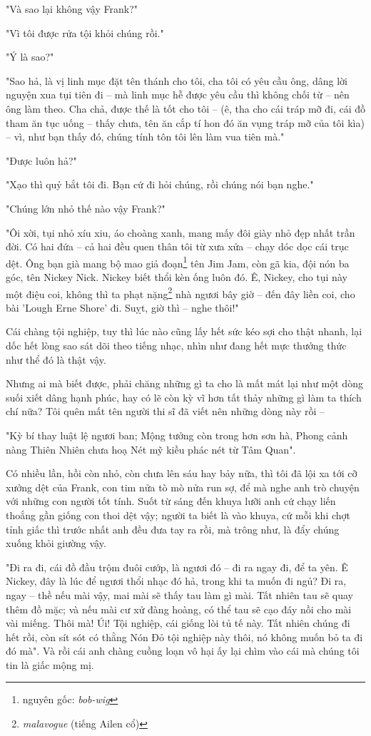 "Và sao lại không vậy Frank?"

"Vì tôi được rửa tội khỏi chúng rồi."

"Ý là sao?"

"Sao hả, là vị linh mục đặt tên thánh cho tôi, cha tôi có yêu cầu ông, dâng lời nguyện xua tụi tiên đi – mà linh mục hễ được yêu cầu thì không chối từ – nên ông làm theo. Cha chả, được thế là tốt cho tôi – (ê, tha cho cái tráp mỡ đi, cái đồ tham ăn tục uống – thấy chưa, tên ăn cắp tí hon đó ăn vụng tráp mỡ của tôi kìa) – vì, như bạn thấy đó, chúng tính tôn tôi lên làm vua tiên mà."

"Được luôn hả?"

"Xạo thì quỷ bắt tôi đi. Bạn cứ đi hỏi chúng, rồi chúng nói bạn nghe."

"Chúng lớn nhỏ thế nào vậy Frank?"

"Ôi xời, tụi nhỏ xíu xiu, áo choàng xanh, mang mấy đôi giày nhỏ đẹp nhất trần đời. Có hai đứa – cả hai đều quen thân tôi từ xưa xửa – chạy dóc dọc cái trục dệt. Ông bạn già mang bộ mao giả đoạn\footnote{nguyên gốc: \textit{bob-wig}} tên Jim Jam, còn gã kia, đội nón ba góc, tên Nickey Nick. Nickey biết thổi kèn ống luôn đó. Ê, Nickey, cho tụi này một điệu coi, không thì ta phạt nặng\footnote{\textit{malavogue} (tiếng Ailen cổ)} nhà ngươi bây giờ – đến đây liền coi, cho bài 'Lough Erne Shore' đi. Suỵt, giờ thì – nghe thôi!"

Cái chàng tội nghiệp, tuy thì lúc nào cũng lấy hết sức kéo sợi cho thật nhanh, lại dốc hết lòng sao sát dõi theo tiếng nhạc, nhìn như đang hết mực thưởng thức như thể đó là thật vậy.

Nhưng ai mà biết được, phải chăng những gì ta cho là mất mát lại như một dòng suối xiết dâng hạnh phúc, hay có lẽ còn kỳ vĩ hơn tất thảy những gì làm ta thích chí nữa? Tôi quên mất tên người thi sĩ đã viết nên những dòng này rồi –

"Kỳ bí thay luật lệ ngươi ban;
Mộng tưởng còn trong hơn sơn hà,
Phong cảnh nàng Thiên Nhiên chưa hoạ
Nét mỹ kiều phác nét từ Tâm Quan".

Có nhiều lần, hồi còn nhỏ, còn chưa lên sáu hay bảy nữa, thì tôi đã lội xa tới cỡ xưởng dệt của Frank, con tim nửa tò mò nửa run sợ, để mà nghe anh trò chuyện với những con người tốt tính. Suốt từ sáng đến khuya lưỡi anh cứ chạy liến thoắng gần giống con thoi dệt vậy; người ta biết là vào khuya, cứ mỗi khi chợt tỉnh giấc thì trước nhất anh đều đưa tay ra rồi, mà trông như, là đẩy chúng xuống khỏi giường vậy.

"Đi ra đi, cái đồ đầu trộm đuôi cướp, là ngươi đó – đi ra ngay đi, để ta yên. Ê Nickey, đây là lúc để ngươi thổi nhạc đó hả, trong khi ta muốn đi ngủ? Đi ra, ngay – thề nếu mài vậy, mai mài sẽ thấy tau làm gì mài. Tất nhiên tau sẽ quay thêm đồ mặc; và nếu mài cư xử đàng hoàng, có thể tau sẽ cạo đáy nồi cho mài vài miếng. Thôi mà! Úi! Tội nghiệp, cái giống lòi tủ tế này. Tất nhiên chúng đi hết rồi, còn sít sót có thằng Nón Đỏ tội nghiệp này thôi, nó không muốn bỏ ta đi đó mà". Và rồi cái anh chàng cuồng loạn vô hại ấy lại chìm vào cái mà chúng tôi tin là giấc mộng mị.

